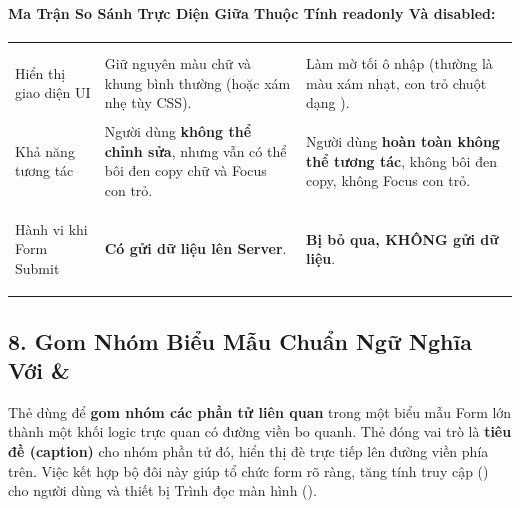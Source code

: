 \paragraph{Ma Trận So Sánh Trực Diện Giữa Thuộc Tính readonly Và disabled:}

\begin{prettyTableBox}
\sffamily\small
\begin{tabularx}{\linewidth}{>{\sffamily\bfseries\color{primaryBlue}\raggedright\arraybackslash}m{3.2cm} Z Z}
 &  &  \\

Hiển thị giao diện UI & Giữ nguyên màu chữ và khung bình thường (hoặc xám nhẹ tùy CSS). & Làm mờ tối ô nhập (thường là màu xám nhạt, con trỏ chuột dạng ). \\

Khả năng tương tác & Người dùng \textbf{không thể chỉnh sửa}, nhưng vẫn có thể bôi đen copy chữ và Focus con trỏ. & Người dùng \textbf{hoàn toàn không thể tương tác}, không bôi đen copy, không Focus con trỏ. \\

Hành vi khi Form Submit &  \;\textcolor{tipBorder}{\textbf{Có gửi dữ liệu lên Server}}. &  \;\textcolor{accentOrange}{\textbf{Bị bỏ qua, KHÔNG gửi dữ liệu}}. \\
\end{tabularx}
\end{prettyTableBox}

\subsection{8. Gom Nhóm Biểu Mẫu Chuẩn Ngữ Nghĩa Với  \& }

\begin{conceptBox}
Thẻ  dùng để \textbf{gom nhóm các phần tử liên quan} trong một biểu mẫu Form lớn thành một khối logic trực quan có đường viền bo quanh. Thẻ  đóng vai trò là \textbf{tiêu đề (caption)} cho nhóm phần tử đó, hiển thị đè trực tiếp lên đường viền phía trên. Việc kết hợp bộ đôi này giúp tổ chức form rõ ràng, tăng tính truy cập () cho người dùng và thiết bị Trình đọc màn hình ().
\end{conceptBox}

